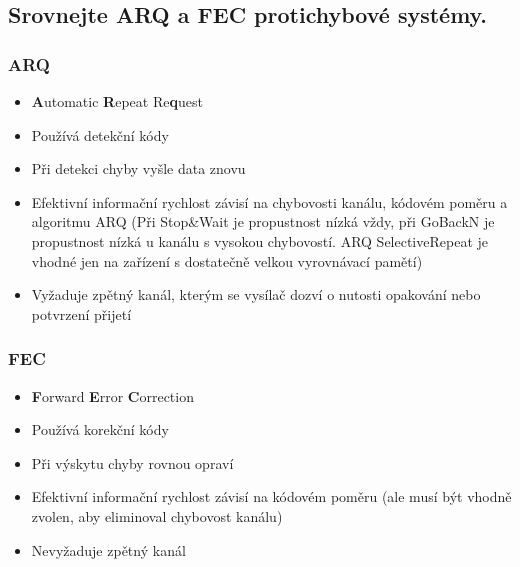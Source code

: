 \subsection{Srovnejte ARQ a FEC protichybové systémy.}
\subsubsection{ARQ}
\begin{itemize}
    \item \textbf{A}utomatic \textbf{R}epeat Re\textbf{q}uest
    \item Používá detekční kódy
    \item Při detekci chyby vyšle data znovu
    \item Efektivní informační rychlost závisí na chybovosti kanálu, kódovém poměru a algoritmu ARQ 
    (Při Stop\&Wait je propustnost nízká vždy, při GoBackN je propustnost nízká u kanálu  s vysokou chybovostí.
    ARQ SelectiveRepeat je vhodné jen na zařízení s dostatečně velkou vyrovnávací pamětí)
    \item Vyžaduje zpětný kanál, kterým se vysílač dozví o nutosti opakování nebo potvrzení přijetí
\end{itemize}
\subsubsection{FEC}
\begin{itemize}
    \item \textbf{F}orward \textbf{E}rror \textbf{C}orrection
    \item Používá korekční kódy
    \item Při výskytu chyby rovnou opraví
    \item Efektivní informační rychlost závisí na kódovém poměru 
    (ale musí být vhodně zvolen, aby eliminoval chybovost kanálu)
    \item Nevyžaduje zpětný kanál
\end{itemize}

